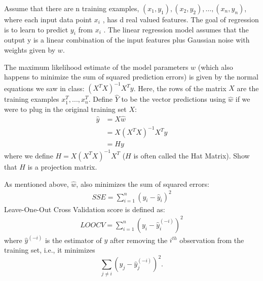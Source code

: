 \begin{enumerate}
Assume that there are n training examples, $(x_1, y_1),(x_2, y_2), \ldots
,(x_n, y_n)$, where each input data point $x_i$ , has d real valued
features. The goal of regression is to learn to predict $y_i$ from $x_i$ .
The linear regression model assumes that the output y is a linear
combination of the input features plus Gaussian noise with weights
given by $w$.

The maximum likelihood estimate of the model parameters $w$ (which also
happens to minimize the sum of squared prediction errors) is given by
the normal equations we saw in class: $(X^T X)^{-1} X^T y$. Here, the rows of the matrix $X$ are the training examples $x_1^T,...,x_n^T$. Define $\hat{Y}$ to be the vector predictions using $\hat{w}$ if we were to plug in the original training set $X$:
\begin{align*}
    \hat{y}&=X\hat{w}\\&=X(X^T X )^{-1} X^T y\\&= H y
\end{align*}
where we define $H=X(X^T X )^{-1} X^T$ ($H$ is often called the Hat Matrix). Show that $H$ is a projection matrix.

As mentioned above, $\hat{w}$, also minimizes the sum of squared errors:
\begin{align*}
    SSE=\sum_{i=1}^n (y_i-\hat{y}_i)^2
\end{align*}
Leave-One-Out Cross Validation score is defined as:
\begin{align*}
    LOOCV=\sum_{i=1}^n (y_i-\hat{y}_i^{(-i)})^2
\end{align*}
where $\hat{y}^{(-i)}$ is the estimator of $y$ after removing the $i^{th}$ observation from the training set, i.e., it minimizes 
$$\sum_{j\neq i} (y_j-\hat{y}^{(-i)}_j)^2.$$


\end{enumerate}
